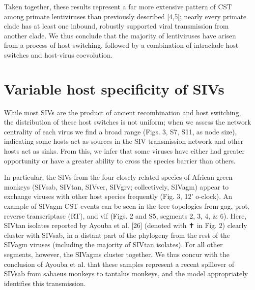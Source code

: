 Taken together, these results represent a far more extensive pattern of CST among primate lentiviruses than previously described [4,5]; nearly every primate clade has at least one inbound, robustly supported viral transmission from another clade.
We thus conclude that the majority of lentiviruses have arisen from a process of host switching, followed by a combination of intraclade host switches and host-virus coevolution.



\section{Variable host specificity of SIVs}
While most SIVs are the product of ancient recombination and host switching, the distribution of these host switches is not uniform; when we assess the network centrality of each virus we find a broad range (Figs. 3, S7, S11, as node size), indicating some hosts act as sources in the SIV transmission network and other hosts act as sinks.
From this, we infer that some viruses have either had greater opportunity or have a greater ability to cross the species barrier than others.

In particular, the SIVs from the four closely related species of African green monkeys (SIVsab, SIVtan, SIVver, SIVgrv; collectively, SIVagm) appear to exchange viruses with other host species frequently (Fig. 3, 12’ o-clock).
An example of SIVagm CST events can be seen in the tree topologies from gag, prot, reverse transcriptase (RT), and vif (Figs. 2 and S5, segments 2, 3, 4, & 6).
Here, SIVtan isolates reported by Ayouba et al. [26] (denoted with ✝ in Fig. 2) clearly cluster with SIVsab, in a distant part of the phylogeny from the rest of the SIVagm viruses (including the majority of SIVtan isolates).
For all other segments, however, the SIVagms cluster together.
We thus concur with the conclusion of Ayouba et al. that these samples represent a recent spillover of SIVsab from sabaeus monkeys to tantalus monkeys, and the model appropriately identifies this transmission.

